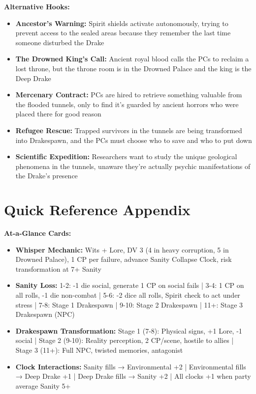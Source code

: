 \documentclass[11pt]{article}
\begin{document}
\textbf{Alternative Hooks:}
\begin{itemize}
\item \textbf{Ancestor's Warning:} Spirit shields activate autonomously, trying to prevent access to the sealed areas because they remember the last time someone disturbed the Drake
\item \textbf{The Drowned King's Call:} Ancient royal blood calls the PCs to reclaim a lost throne, but the throne room is in the Drowned Palace and the king is the Deep Drake
\item \textbf{Mercenary Contract:} PCs are hired to retrieve something valuable from the flooded tunnels, only to find it's guarded by ancient horrors who were placed there for good reason
\item \textbf{Refugee Rescue:} Trapped survivors in the tunnels are being transformed into Drakespawn, and the PCs must choose who to save and who to put down
\item \textbf{Scientific Expedition:} Researchers want to study the unique geological phenomena in the tunnels, unaware they're actually psychic manifestations of the Drake's presence
\end{itemize}

\section{Quick Reference Appendix}

\textbf{At-a-Glance Cards:}
\begin{itemize}
\item \textbf{Whisper Mechanic:} Wits + Lore, DV 3 (4 in heavy corruption, 5 in Drowned Palace), 1 CP per failure, advance Sanity Collapse Clock, risk transformation at 7+ Sanity
\item \textbf{Sanity Loss:} 1-2: -1 die social, generate 1 CP on social fails | 3-4: 1 CP on all rolls, -1 die non-combat | 5-6: -2 dice all rolls, Spirit check to act under stress | 7-8: Stage 1 Drakespawn | 9-10: Stage 2 Drakespawn | 11+: Stage 3 Drakespawn (NPC)
\item \textbf{Drakespawn Transformation:} Stage 1 (7-8): Physical signs, +1 Lore, -1 social | Stage 2 (9-10): Reality perception, 2 CP/scene, hostile to allies | Stage 3 (11+): Full NPC, twisted memories, antagonist
\item \textbf{Clock Interactions:} Sanity fills → Environmental +2 | Environmental fills → Deep Drake +1 | Deep Drake fills → Sanity +2 | All clocks +1 when party average Sanity 5+
\end{itemize}
\end{document}
